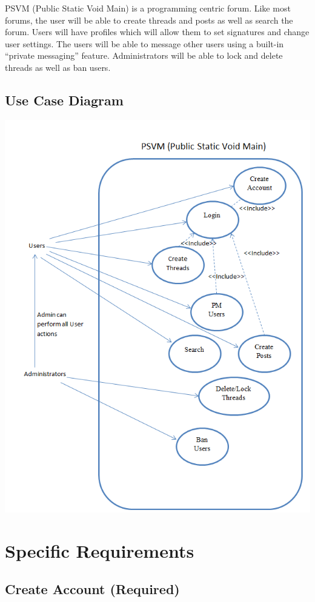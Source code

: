 \documentclass[12pt]{scrartcl}
\begin{document}
PSVM (Public Static Void Main) is a programming centric forum. Like most forums, the user will be able to create threads and posts as well as search the forum. Users will have profiles which will allow them to set signatures and change user settings.  The users will be able to message other users using a built-in “private messaging” feature. Administrators will be able to lock and delete threads as well as ban users.

\subsection{Use Case Diagram}

\includegraphics{use-case.PNG}

\section{Specific Requirements}
\subsection{Create Account (Required)}
\end{document}

